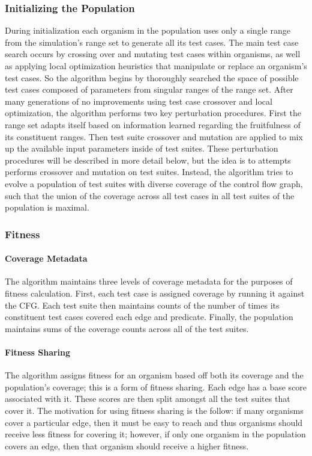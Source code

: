 \documentclass[runningheads]{llncs}
\begin{document}
\subsubsection{Initializing the Population}

During initialization each organism in the population uses only a single range from the simulation's range set to generate all its test cases. The main test case search occurs by crossing over and mutating test cases within organisms, as well as applying local optimization heuristics that manipulate or replace an organism's test cases. So the algorithm begins by thoroughly searched the space of possible test cases composed of parameters from singular ranges of the range set. After many generations of no improvements using test case crossover and local optimization, the algorithm  performs two key perturbation procedures. First the range set adapts itself based on information learned regarding the fruitfulness of its constituent ranges. Then test suite crossover and mutation are applied to mix up the available input parameters inside of test suites. These perturbation procedures will be described in more detail below, but the idea is to  attempts performs crossover and mutation on test suites. Instead, the algorithm tries to evolve a population of test suites with diverse coverage of the control flow graph, such that the union of the coverage across all test cases in all test suites of the population is maximal. 

\subsubsection{Fitness}

\paragraph{Coverage Metadata}
The algorithm maintains three levels of coverage metadata for the purposes of fitness calculation. First, each test case is assigned coverage by running it against the CFG. Each test suite then maintains counts of the number of times its constituent test cases covered each edge and predicate. Finally, the population maintains sums of the coverage counts across all of the test suites.

\paragraph{Fitness Sharing}
The algorithm assigns fitness for an organism based off both its coverage and the population's coverage; this is a form of fitness sharing. Each edge has a base score associated with it. These scores are then split amongst all the test suites that cover it. The motivation for using fitness sharing is the follow: if many organisms cover a particular edge, then it must be easy to reach and thus organisms should receive less fitness for covering it; however, if only one organism in the population covers an edge, then that organism should receive a higher fitness.
\end{document}
